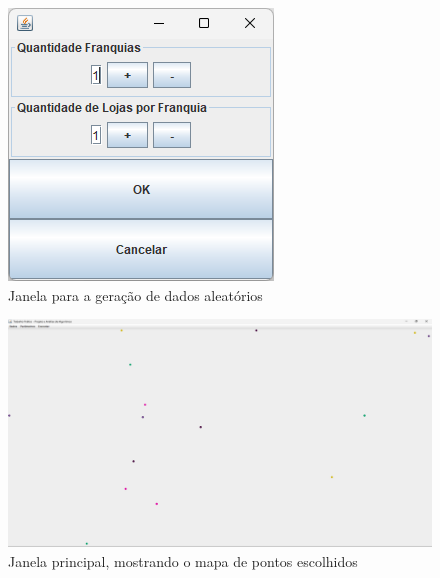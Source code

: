 \documentclass[12pt]{article}
\begin{document}
\begin{figure}[H]
    \centering
    \includegraphics[width=\textwidth]{Captura de tela 2024-06-01 110836}
    \caption{Janela para a geração de dados aleatórios}
    \label{fig:fig-2}
\end{figure}

\begin{figure}[H]
    \centering
    \includegraphics[width=\textwidth]{Captura de tela 2024-06-01 110914}
    \caption{Janela principal, mostrando o mapa de pontos escolhidos}
    \label{fig:fig-3}
\end{figure}
\end{document}
